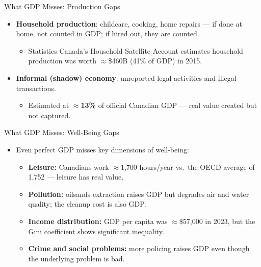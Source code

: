 \documentclass[aspectratio=169]{beamer}
\begin{document}
\begin{frame}{What GDP Misses: Production Gaps}
\transfade
\begin{itemize}
  \item \textbf{Household production}: childcare, cooking, home repairs --- if done at home, not counted in GDP; if hired out, they are counted.
  \begin{itemize}
    \item Statistics Canada's Household Satellite Account estimates household production was worth $\approx$\$460B (41\% of GDP) in 2015.
  \end{itemize}
  \item \textbf{Informal (shadow) economy}: unreported legal activities and illegal transactions.
  \begin{itemize}
    \item Estimated at $\approx$\textbf{13\%} of official Canadian GDP --- real value created but not captured.
  \end{itemize}
\end{itemize}
\end{frame}

\begin{frame}{What GDP Misses: Well-Being Gaps}
\transfade
\begin{itemize}
  \item Even perfect GDP misses key dimensions of well-being:
  \begin{itemize}
    \item \textbf{Leisure:} Canadians work $\approx$1,700 hours/year vs.\ the OECD average of 1,752 --- leisure has real value.
    \item \textbf{Pollution:} oilsands extraction raises GDP but degrades air and water quality; the cleanup cost is also GDP.
    \item \textbf{Income distribution:} GDP per capita was $\approx$\$57,000 in 2023, but the Gini coefficient shows significant inequality.
    \item \textbf{Crime and social problems:} more policing raises GDP even though the underlying problem is bad.
  \end{itemize}
\end{itemize}
\end{frame}
\end{document}
